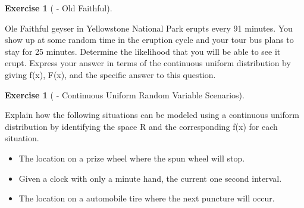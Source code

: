 \documentclass[10pt,]{book}
\theoremstyle{plain}
\theoremstyle{definition}
\theoremstyle{definition}
\theoremstyle{definition}
\newtheorem{exercise}[theorem]{Exercise}
\numberwithin{equation}{section}
\begin{document}
\begin{exercise}[{ - Old Faithful}]\label{exercise-49}

Ole Faithful geyser in Yellowstone National Park erupts every 91 minutes. You show up at some random time in the eruption cycle and your tour bus plans to stay for 25 minutes. Determine the likelihood that you will be able to see it erupt.  Express your answer in terms of the continuous uniform distribution by giving f(x), F(x), and the specific answer to this question.
%
\end{exercise}
\begin{exercise}[{ - Continuous Uniform Random Variable Scenarios}]\label{exercise-50}

Explain how the following situations can be modeled using a continuous uniform distribution by identifying the space R and the corresponding f(x) for each situation.
\leavevmode%
\begin{itemize}[label=\textbullet]
\item{}The location on a prize wheel where the spun wheel will stop.%
\item{}Given a clock with only a minute hand, the current one second interval.%
\item{}The location on a automobile tire where the next puncture will occur.%
\end{itemize}

%
\end{exercise}
\end{document}
